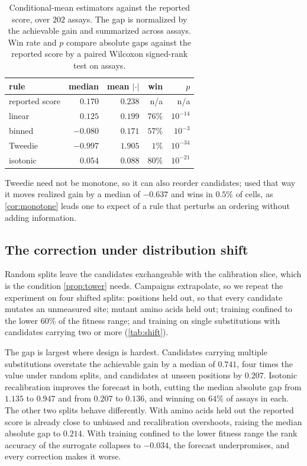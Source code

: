 \documentclass{article}
\theoremstyle{plain}
\theoremstyle{definition}
\begin{document}
\begin{table}[t]
\caption{Conditional-mean estimators against the reported score, over $202$ assays.
The gap is normalized by the achievable gain and summarized across assays. Win rate and
$p$ compare absolute gaps against the reported score by a paired Wilcoxon signed-rank
test on assays.}
\label{tab:condmean}
\vskip 0.1in
\begin{center}
\begin{small}
\begin{tabular}{lrrrr}
\toprule
rule & median & mean $|\cdot|$ & win & $p$ \\
\midrule
reported score & $\phantom{-}0.170$ & $0.238$ & n/a & n/a \\
linear         & $\phantom{-}0.125$ & $0.199$ & $76\%$ & $10^{-14}$ \\
binned         & $-0.080$ & $0.171$ & $57\%$ & $10^{-3}$ \\
Tweedie        & $-0.997$ & $1.905$ & $\phantom{0}1\%$ & $10^{-34}$ \\
isotonic       & $\phantom{-}0.054$ & $0.088$ & $80\%$ & $10^{-21}$ \\
\bottomrule
\end{tabular}
\end{small}
\end{center}
\vskip -0.1in
\end{table}

Tweedie need not be monotone, so it can also reorder candidates; used that way it
moves realized gain by a median of $-0.637$ and wins in $0.5\%$ of cells, as
\cref{cor:monotone} leads one to expect of a rule that perturbs an ordering without
adding information.

\subsection{The correction under distribution shift}
\label{sec:results-shift}

Random splits leave the candidates exchangeable with the calibration slice, which is
the condition \cref{prop:tower} needs. Campaigns extrapolate, so we repeat the
experiment on four shifted splits: positions held out, so that every candidate mutates
an unmeasured site; mutant amino acids held out; training confined to the lower $60\%$
of the fitness range; and training on single substitutions with candidates carrying two
or more (\cref{tab:shift}).

The gap is largest where design is hardest. Candidates carrying multiple substitutions
overstate the achievable gain by a median of $0.741$, four times the value under random
splits, and candidates at unseen positions by $0.207$. Isotonic recalibration improves
the forecast in both, cutting the median absolute gap from $1.135$ to $0.947$ and from
$0.207$ to $0.136$, and winning on $64\%$ of assays in each. The other two splits
behave differently. With amino acids held out the reported score is already close to
unbiased and recalibration overshoots, raising the median absolute gap to $0.214$. With
training confined to the lower fitness range the rank accuracy of the surrogate
collapses to $-0.034$, the forecast underpromises, and every correction makes it worse.
\end{document}
